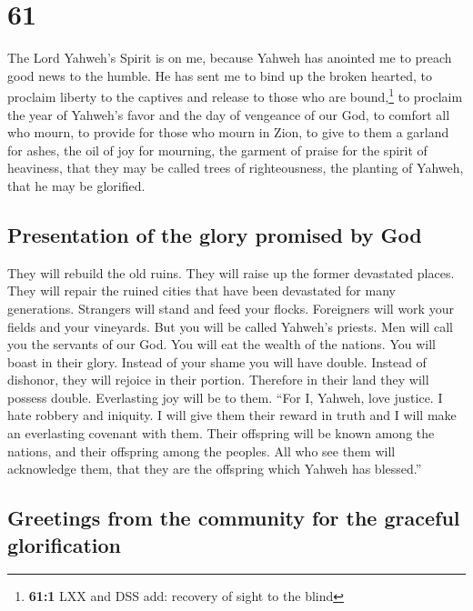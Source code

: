 \hypertarget{section-60}{%
\section{61}\label{section-60}}

 The Lord Yahweh's Spirit is on me, because Yahweh has
anointed me to preach good news to the humble. He has sent me to bind up
the broken hearted, to proclaim liberty to the captives and release to
those who are bound,\footnote{\textbf{61:1} LXX and DSS add: recovery of
  sight to the blind}  to proclaim the year of Yahweh's
favor and the day of vengeance of our God, to comfort all who mourn,
 to provide for those who mourn in Zion, to give to them a
garland for ashes, the oil of joy for mourning, the garment of praise
for the spirit of heaviness, that they may be called trees of
righteousness, the planting of Yahweh, that he may be glorified.

\hypertarget{presentation-of-the-glory-promised-by-god}{%
\subsection{Presentation of the glory promised by
God}\label{presentation-of-the-glory-promised-by-god}}

 They will rebuild the old ruins. They will raise up the
former devastated places. They will repair the ruined cities that have
been devastated for many generations.  Strangers will
stand and feed your flocks. Foreigners will work your fields and your
vineyards.  But you will be called Yahweh's priests. Men
will call you the servants of our God. You will eat the wealth of the
nations. You will boast in their glory.  Instead of your
shame you will have double. Instead of dishonor, they will rejoice in
their portion. Therefore in their land they will possess double.
Everlasting joy will be to them.  ``For I, Yahweh, love
justice. I hate robbery and iniquity. I will give them their reward in
truth and I will make an everlasting covenant with them. 
Their offspring will be known among the nations, and their offspring
among the peoples. All who see them will acknowledge them, that they are
the offspring which Yahweh has blessed.''

\hypertarget{greetings-from-the-community-for-the-graceful-glorification}{%
\subsection{Greetings from the community for the graceful
glorification}\label{greetings-from-the-community-for-the-graceful-glorification}}

